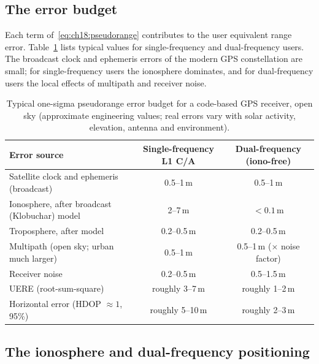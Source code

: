 \subsection{The error budget}

Each term of~\eqref{eq:ch18:pseudorange} contributes to the user equivalent range error.
Table~\ref{tab:ch18:errors} lists typical values for single-frequency and dual-frequency
users. The broadcast clock and ephemeris errors of the modern GPS constellation are small; for
single-frequency users the ionosphere dominates, and for dual-frequency users the local
effects of multipath and receiver noise.

\begin{table}[htbp]\centering\small
\caption{Typical one-sigma pseudorange error budget for a code-based GPS receiver, open sky
(approximate engineering values; real errors vary with solar activity, elevation, antenna and
environment).}
\label{tab:ch18:errors}
\begin{tabularx}{\linewidth}{@{}X c c@{}}
\toprule
Error source & Single-frequency L1 C/A & Dual-frequency (iono-free)\\
\midrule
Satellite clock and ephemeris (broadcast) & 0.5--1\,m & 0.5--1\,m\\
Ionosphere, after broadcast (Klobuchar) model & 2--7\,m & $<0.1$\,m\\
Troposphere, after model & 0.2--0.5\,m & 0.2--0.5\,m\\
Multipath (open sky; urban much larger) & 0.5--1\,m & 0.5--1\,m ($\times$ noise factor)\\
Receiver noise & 0.2--0.5\,m & 0.5--1.5\,m\\
\midrule
UERE (root-sum-square) & roughly 3--7\,m & roughly 1--2\,m\\
Horizontal error (HDOP $\approx1$, 95\%) & roughly 5--10\,m & roughly 2--3\,m\\
\bottomrule
\end{tabularx}
\end{table}

\subsection{The ionosphere and dual-frequency positioning}

